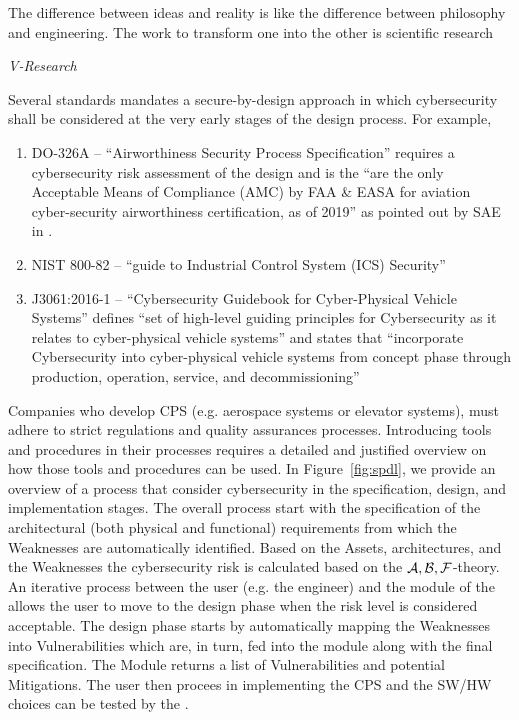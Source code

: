 \epigraph{The difference between ideas and reality is like the
difference between philosophy and engineering. The work to transform one into
the other is scientific research}{{\itshape V-Research}}

Several standards mandates a secure-by-design approach in which 
cybersecurity shall be considered at the very early stages of the 
design process. For example,
\begin{enumerate}[noitemsep]
	\item DO-326A -- ``Airworthiness Security Process Specification''
		requires a cybersecurity risk assessment of the design and is
		the ``are the only Acceptable Means of Compliance (AMC) by FAA
		\& EASA for aviation cyber-security airworthiness certification,
		as of 2019'' as pointed out by SAE in \autocite{SAE2019DO326A}.
	\item NIST 800-82 \autocite{Stouffer2011guide} -- ``guide to Industrial
		Control System (ICS) Security''
	\item J3061:2016-1 \autocite{SAE2016J3061} -- ``Cybersecurity Guidebook
		for Cyber-Physical Vehicle Systems'' defines ``set of
		high-level guiding principles for Cybersecurity as it relates
		to cyber-physical vehicle systems'' and states that
		``incorporate Cybersecurity into cyber-physical vehicle systems
		from concept phase through production, operation, service, and
		decommissioning''
\end{enumerate}
Companies who develop CPS (e.g. aerospace systems or elevator systems), must adhere
to strict regulations and quality assurances processes. Introducing tools and procedures 
in their processes requires a detailed and justified overview on how those
tools and procedures can be used. In Figure~\ref{fig:spdl}, we provide an overview
of a process that consider cybersecurity in the specification, design, and implementation
stages. The overall process start with the specification of the architectural (both physical
and functional) requirements from which the Weaknesses are automatically identified.
Based on the Assets, architectures, and the Weaknesses the cybersecurity risk is
calculated based on the $\mathcal{A},\mathcal{B},\mathcal{F}$-theory. An iterative process between 
the user (e.g. the engineer) and the \secramod module of the \abftool allows the user to move to the design phase
when the risk level is considered acceptable. The design phase starts by automatically mapping
the Weaknesses into Vulnerabilities which are, in turn, fed into the \designverifmod
module along with the final specification. The Module returns a list of Vulnerabilities and
potential Mitigations. The user then procees in implementing the CPS and the SW/HW choices
can be tested by the \atgmod. 

